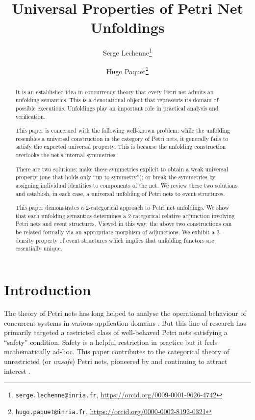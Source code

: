 \documentclass[11pt,a4paper]{article}
\title{\bfseries Universal Properties of Petri Net Unfoldings}
\author[ ]{Serge Lechenne\thanks{\texttt{serge.lechenne@inria.fr}, \url{https://orcid.org/0009-0001-9626-4742}}}
\author[ ]{Hugo Paquet\thanks{\texttt{hugo.paquet@inria.fr}, \url{https://orcid.org/0000-0002-8192-0321}}}
\affil[ ]{Inria, \'Ecole Normale Sup\'erieure -- PSL University, CNRS, France}
\date{}
\theoremstyle{plain}
\theoremstyle{definition}
\theoremstyle{remark}
\begin{document}
\maketitle

\begin{abstract}
\noindent
It is an established idea in concurrency theory that every Petri net admits an
unfolding semantics. This is a denotational object that represents its domain of
possible executions. Unfoldings play an important role in practical analysis and
verification.

This paper is concerned with the following well-known problem: while the
unfolding resembles a universal construction in the category of Petri nets, it
generally fails to satisfy the expected universal property. This is because the
unfolding construction overlooks the net's internal symmetries.

There are two solutions: make these symmetries explicit to obtain a weak
universal property (one that holds only ``up to symmetry''); or break the
symmetries by assigning individual identities to components of the net. We
review these two solutions and establish, in each case, a universal unfolding of
Petri nets to event structures.

This paper demonstrates a 2-categorical approach to Petri net unfoldings. We
show that each unfolding semantics determines a 2-categorical relative
adjunction involving Petri nets and event structures. Viewed in this way, the
above two constructions can be related formally via an appropriate morphism of
adjunctions. We exhibit a 2-density property of event structures which implies
that unfolding functors are essentially unique.
\end{abstract}


\medskip

\section{Introduction}
\label{sec:intro}

The theory of Petri nets has long helped to analyse the operational behaviour of concurrent systems in various application domains \cite{24143,winskel1987petri,PNR}. But this line of research has primarily targeted a restricted class of well-behaved Petri nets satisfying a ``safety'' condition. Safety is a helpful restriction in practice but it feels mathematically ad-hoc. This paper contributes to the categorical theory of unrestricted (or \emph{unsafe}) Petri nets, pioneered by \cite{meseguer1990petri,FMOP} and continuing to attract interest \cite{GENUN,baez2020open,WGPN,baez2021categories}. 
\end{document}
